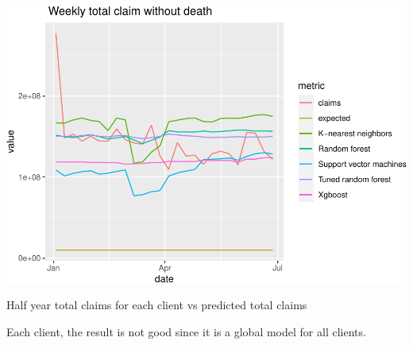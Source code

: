 \documentclass[
]{article}
\begin{document}
\includegraphics{figures/report/fig-unnamed-chunk-86-3.pdf}

Half year total claims for each client vs predicted total claims

Each client, the result is not good since it is a global model for all
clients.
\end{document}

